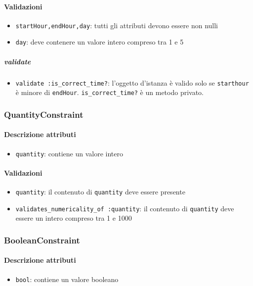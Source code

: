 \documentclass[11pt,a4paper]{article}
\begin{document}
\paragraph{Validazioni}
\begin{itemize}
 \item \verb|startHour,endHour,day|: tutti gli attributi devono essere non nulli
 \item \verb|day|: deve contenere un valore intero compreso tra 1 e 5
 \end{itemize}

\subparagraph{validate}
\begin{itemize}
 \item \verb|validate :is_correct_time?|: l'oggetto d'istanza è valido solo se \verb|starthour| è minore di \verb|endHour|. \verb|is_correct_time?| è un metodo privato.
\end{itemize}
\subsubsection{QuantityConstraint}
\paragraph{Descrizione attributi}
\begin{itemize}
 \item \verb|quantity|: contiene un valore intero
\end{itemize}
\paragraph{Validazioni}
\begin{itemize}
 \item \verb|quantity|: il contenuto di \verb|quantity| deve essere presente
 \item \verb|validates_numericality_of :quantity|: il contenuto di \verb|quantity| deve essere un intero compreso tra 1 e 1000 
\end{itemize}
\subsubsection{BooleanConstraint}
\paragraph{Descrizione attributi}
\begin{itemize}
 \item \verb|bool|: contiene un valore booleano
\end{itemize}
\end{document}
